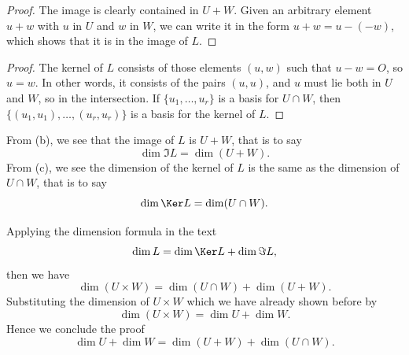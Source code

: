 {{\begin{Solution}
{\begin{proof}
            The image is clearly contained in $U + W$. 
            Given an arbitrary element $u + w$ with $u$ in $U$ and $w$ in $W$, we can write it in the form $u + w = u - (-w)$, which shows that it is in the image of $L$. 
        \end{proof}
        \item
        \begin{proof}
            The kernel of $L$ consists of those elements $(u, w)$ such that $u - w = O$, so $u = w$. 
            In other words, it consists of the pairs $(u, u)$, and $u$ must lie both in $U$ and $W$, so in the intersection. 
            If $\{ u_1, \dots, u_r \}$ is a basis for $U \cap W$, then $\{ (u_1, u_1), \dots, (u_r, u_r) \}$ is a basis for the kernel of $L$. 
        \end{proof}
        \item 
        From (b), we see that the image of $L$ is $U + W$, that is to say
        \begin{equation*}
            \dim \Im L = \dim (U + W).
        \end{equation*}
        From (c), we see the dimension of the kernel of $L$ is the same as the dimension of $U \cap W$, that is to say
        \begin{equation*}
            \dim \Ker L = \dim (U \cap W).
        \end{equation*}

        Applying the dimension formula in the text
        \begin{equation*}
            \dim L = \dim \Ker L + \dim \Im L, 
        \end{equation*}
        then we have
        \begin{equation*}
            \dim (U \times W) = \dim (U \cap W) + \dim (U + W).
        \end{equation*}
        Substituting the dimension of $U \times W$ which we have already shown before by 
        \begin{equation*}
            \dim (U \times W) = \dim U + \dim W. 
        \end{equation*}
        Hence we conclude the proof
        \begin{equation*}
            \dim U + \dim W = \dim (U + W) + \dim (U \cap W). 
        \end{equation*}
    }
    \end{Solution}
}}
